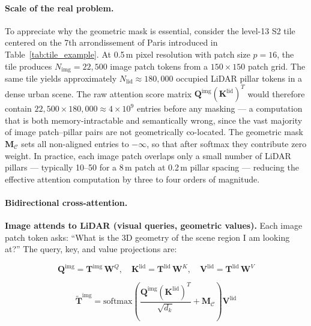 \documentclass{book}
\begin{document}
\paragraph{Scale of the real problem.}

To appreciate why the geometric mask is essential, consider the
level-13 S2 tile centered on the 7th arrondissement of Paris
introduced in Table~\ref{tab:tile_example}.  At 0.5\,m pixel
resolution with patch size $p = 16$, the tile produces
$N_{\text{img}} = 22{,}500$ image patch tokens from a
$150 \times 150$ patch grid.  The same tile yields approximately
$N_{\text{lid}} \approx 180{,}000$ occupied LiDAR pillar tokens
in a dense urban scene.  The raw attention score matrix
$\mathbf{Q}^{\text{img}}(\mathbf{K}^{\text{lid}})^T$ would therefore
contain $22{,}500 \times 180{,}000 \approx 4 \times 10^9$ entries
before any masking --- a computation that is both memory-intractable
and semantically wrong, since the vast majority of image patch--pillar
pairs are not geometrically co-located.  The geometric mask
$\mathbf{M}_{\mathcal{C}}$ sets all non-aligned entries to $-\infty$,
so that after softmax they contribute zero weight.  In practice,
each image patch overlaps only a small number of LiDAR pillars ---
typically 10--50 for a 8\,m patch at 0.2\,m pillar spacing ---
reducing the effective attention computation by three to four orders
of magnitude.

\paragraph{Bidirectional cross-attention.}

\textbf{Image attends to LiDAR (visual queries, geometric values).}
Each image patch token asks: ``What is the 3D geometry of the scene
region I am looking at?''  The query, key, and value projections are:

\begin{equation}
  \mathbf{Q}^{\text{img}} = \mathbf{T}^{\text{img}}\,\mathbf{W}^Q,\quad
  \mathbf{K}^{\text{lid}} = \mathbf{T}^{\text{lid}}\,\mathbf{W}^K,\quad
  \mathbf{V}^{\text{lid}} = \mathbf{T}^{\text{lid}}\,\mathbf{W}^V
  \label{eq:img2lid_qkv}
\end{equation}

\begin{equation}
  \widetilde{\mathbf{T}}^{\text{img}} =
    \mathrm{softmax}\!\!\left(
      \frac{\mathbf{Q}^{\text{img}}(\mathbf{K}^{\text{lid}})^T}{\sqrt{d_k}}
      + \mathbf{M}_{\mathcal{C}}
    \right)\mathbf{V}^{\text{lid}}
  \label{eq:img2lid_attn}
\end{equation}
\end{document}
